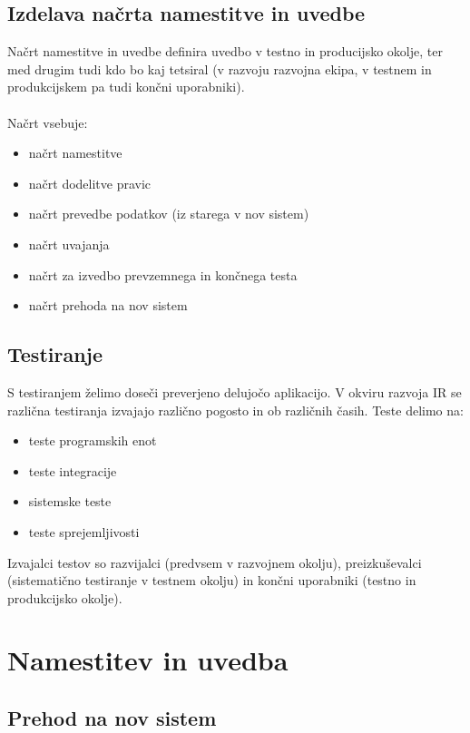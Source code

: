 \documentclass[a4paper,12pt]{report}
\begin{document}
   \subsection{Izdelava načrta namestitve in uvedbe}
   Načrt namestitve in uvedbe definira uvedbo v testno in producijsko okolje, ter med drugim tudi kdo bo kaj tetsiral 
   (v razvoju razvojna ekipa, v testnem in produkcijskem pa tudi končni uporabniki).
   \\\\
   Načrt vsebuje:
   \begin{itemize}
      \item načrt namestitve
      \item načrt dodelitve pravic
      \item načrt prevedbe podatkov (iz starega v nov sistem)
      \item načrt uvajanja
      \item načrt za izvedbo prevzemnega in končnega testa
      \item načrt prehoda na nov sistem
   \end{itemize}

   \subsection{Testiranje}
   S testiranjem želimo doseči preverjeno delujočo aplikacijo. V okviru razvoja IR se različna testiranja izvajajo različno pogosto in ob različnih časih.
   Teste delimo na:
   \begin{itemize}
      \item teste programskih enot
      \item teste integracije
      \item sistemske teste
      \item teste sprejemljivosti
   \end{itemize}

   Izvajalci testov so razvijalci (predvsem v razvojnem okolju), preizkuševalci (sistematično testiranje v testnem okolju) in
   končni uporabniki (testno in produkcijsko okolje).


   \section{Namestitev in uvedba}
   \subsection{Prehod na nov sistem}
   
\end{document}
